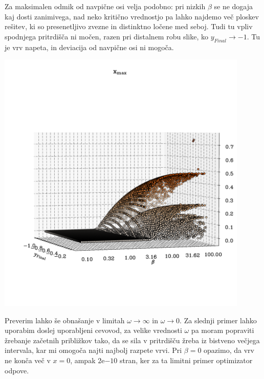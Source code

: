 Za maksimalen odmik od navpične osi velja podobno: pri nizkih $\beta$ se ne dogaja kaj dosti zanimivega, nad neko kritično vrednostjo pa lahko najdemo več ploskev rešitev, ki so presenetljivo zvezne in distinktno ločene med seboj. Tudi tu vpliv spodnjega pritrdišča ni močen, razen pri distalnem robu slike, ko $y_{Final} \rightarrow -1 $. Tu je vrv napeta, in deviacija od navpične osi ni mogoča.
\begin{center}
     \includegraphics[width=0.9\textwidth]{../images/2024-1-fazni_portret_xmax.pdf}
\end{center}

Preverim lahko še obnašanje v limitah $\omega \rightarrow \infty$ in $\omega \rightarrow 0$. Za slednji primer lahko uporabim doslej uporabljeni cevovod, za velike vrednosti $\omega$ pa moram popraviti žrebanje začetnih približkov tako, da se sila v pritrdišču žreba iz bistveno večjega intervala, kar mi omogoča najti najbolj razpete vrvi. Pri $\beta=0$ opazimo, da vrv ne konča več v $x = 0$, ampak $2\mathrm{e} {-10}$ stran, ker za ta limitni primer optimizator odpove.

